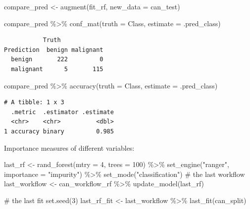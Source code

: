 \documentclass[
  letterpaper,
  DIV=11,
  numbers=noendperiod]{scrreprt}
\newenvironment{Shaded}{\begin{snugshade}}{\end{snugshade}}
\newcommand{\AttributeTok}[1]{\textcolor[rgb]{0.40,0.45,0.13}{#1}}
\newcommand{\CommentTok}[1]{\textcolor[rgb]{0.37,0.37,0.37}{#1}}
\newcommand{\DecValTok}[1]{\textcolor[rgb]{0.68,0.00,0.00}{#1}}
\newcommand{\FunctionTok}[1]{\textcolor[rgb]{0.28,0.35,0.67}{#1}}
\newcommand{\NormalTok}[1]{\textcolor[rgb]{0.00,0.23,0.31}{#1}}
\newcommand{\OtherTok}[1]{\textcolor[rgb]{0.00,0.23,0.31}{#1}}
\newcommand{\SpecialCharTok}[1]{\textcolor[rgb]{0.37,0.37,0.37}{#1}}
\newcommand{\StringTok}[1]{\textcolor[rgb]{0.13,0.47,0.30}{#1}}
\begin{document}
\begin{Shaded}
\begin{Highlighting}[]
\NormalTok{compare\_pred }\OtherTok{\textless{}{-}} \FunctionTok{augment}\NormalTok{(fit\_rf, }\AttributeTok{new\_data =}\NormalTok{ can\_test) }

\NormalTok{compare\_pred }\SpecialCharTok{\%\textgreater{}\%} \FunctionTok{conf\_mat}\NormalTok{(}\AttributeTok{truth =}\NormalTok{ Class, }\AttributeTok{estimate =}\NormalTok{ .pred\_class)}
\end{Highlighting}
\end{Shaded}

\begin{verbatim}
           Truth
Prediction  benign malignant
  benign       222         0
  malignant      5       115
\end{verbatim}

\begin{Shaded}
\begin{Highlighting}[]
\NormalTok{compare\_pred }\SpecialCharTok{\%\textgreater{}\%}  \FunctionTok{accuracy}\NormalTok{(}\AttributeTok{truth =}\NormalTok{ Class, }\AttributeTok{estimate =}\NormalTok{ .pred\_class)}
\end{Highlighting}
\end{Shaded}

\begin{verbatim}
# A tibble: 1 x 3
  .metric  .estimator .estimate
  <chr>    <chr>          <dbl>
1 accuracy binary         0.985
\end{verbatim}

Importance measures of different variables:

\begin{Shaded}
\begin{Highlighting}[]
\NormalTok{last\_rf }\OtherTok{\textless{}{-}} 
  \FunctionTok{rand\_forest}\NormalTok{(}\AttributeTok{mtry =} \DecValTok{4}\NormalTok{, }\AttributeTok{trees =} \DecValTok{100}\NormalTok{) }\SpecialCharTok{\%\textgreater{}\%} 
  \FunctionTok{set\_engine}\NormalTok{(}\StringTok{"ranger"}\NormalTok{,  }\AttributeTok{importance =} \StringTok{"impurity"}\NormalTok{) }\SpecialCharTok{\%\textgreater{}\%} 
  \FunctionTok{set\_mode}\NormalTok{(}\StringTok{"classification"}\NormalTok{)}
\CommentTok{\# the last workflow}
\NormalTok{last\_workflow }\OtherTok{\textless{}{-}} 
\NormalTok{  can\_workflow\_rf }\SpecialCharTok{\%\textgreater{}\%} 
  \FunctionTok{update\_model}\NormalTok{(last\_rf)}

\CommentTok{\# the last fit}
\FunctionTok{set.seed}\NormalTok{(}\DecValTok{3}\NormalTok{)}
\NormalTok{last\_rf\_fit }\OtherTok{\textless{}{-}} 
\NormalTok{  last\_workflow }\SpecialCharTok{\%\textgreater{}\%} 
  \FunctionTok{last\_fit}\NormalTok{(can\_split)}
\end{Highlighting}
\end{Shaded}
\end{document}
